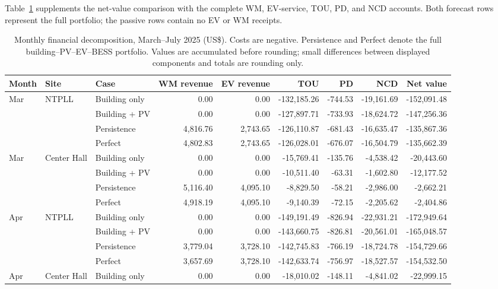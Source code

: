 \documentclass[final,5p,times]{elsarticle}
\begin{document}
Table~\ref{tab:site_monthly_decomposition} supplements the net-value comparison
with the complete WM, EV-service, TOU, PD, and NCD accounts. Both forecast
rows represent the full portfolio; the passive rows contain no EV or WM receipts.
\begin{table}[!t]
\centering
\caption{Monthly financial decomposition, March--July 2025 (US\$). Costs are negative. Persistence and Perfect denote the full building--PV--EV--BESS portfolio. Values are accumulated before rounding; small differences between displayed components and totals are rounding only.}
\label{tab:site_monthly_decomposition}
\footnotesize
\setlength{\tabcolsep}{3pt}
\begin{tabular}{@{}lllrrrrrr@{}}
\toprule
Month & Site & Case & WM revenue & EV revenue & TOU & PD & NCD & Net value\\
\midrule
Mar & NTPLL & Building only & 0.00 & 0.00 & -132,185.26 & -744.53 & -19,161.69 & -152,091.48 \\
 &  & Building + PV & 0.00 & 0.00 & -127,897.71 & -733.93 & -18,624.72 & -147,256.36 \\
 &  & Persistence & 4,816.76 & 2,743.65 & -126,110.87 & -681.43 & -16,635.47 & -135,867.36 \\
 &  & Perfect & 4,802.83 & 2,743.65 & -126,028.01 & -676.07 & -16,504.79 & -135,662.39 \\
\addlinespace
Mar & Center Hall & Building only & 0.00 & 0.00 & -15,769.41 & -135.76 & -4,538.42 & -20,443.60 \\
 &  & Building + PV & 0.00 & 0.00 & -10,511.40 & -63.31 & -1,602.80 & -12,177.52 \\
 &  & Persistence & 5,116.40 & 4,095.10 & -8,829.50 & -58.21 & -2,986.00 & -2,662.21 \\
 &  & Perfect & 4,918.19 & 4,095.10 & -9,140.39 & -72.15 & -2,205.62 & -2,404.86 \\
\addlinespace
Apr & NTPLL & Building only & 0.00 & 0.00 & -149,191.49 & -826.94 & -22,931.21 & -172,949.64 \\
 &  & Building + PV & 0.00 & 0.00 & -143,660.75 & -826.81 & -20,561.01 & -165,048.57 \\
 &  & Persistence & 3,779.04 & 3,728.10 & -142,745.83 & -766.19 & -18,724.78 & -154,729.66 \\
 &  & Perfect & 3,657.69 & 3,728.10 & -142,633.74 & -756.97 & -18,527.57 & -154,532.50 \\
\addlinespace
Apr & Center Hall & Building only & 0.00 & 0.00 & -18,010.02 & -148.11 & -4,841.02 & -22,999.15 \\

\end{tabular}
\end{table}
\end{document}
